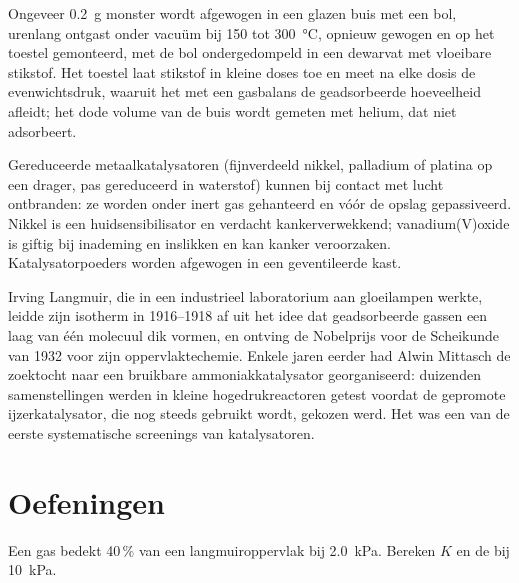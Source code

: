 \begin{inthelab}
Ongeveer \qty{0.2}{g} monster wordt afgewogen in een glazen buis met een
bol, urenlang ontgast onder vacuüm bij 150 tot \qty{300}{\celsius},
opnieuw gewogen en op het toestel gemonteerd, met de bol ondergedompeld in
een dewarvat met vloeibare stikstof. Het toestel laat stikstof in kleine
doses toe en meet na elke dosis de evenwichtsdruk, waaruit het met een
gasbalans de geadsorbeerde hoeveelheid afleidt; het dode volume van de
buis wordt gemeten met helium, dat niet adsorbeert.
\end{inthelab}

\begin{safety}{}
Gereduceerde metaalkatalysatoren (fijnverdeeld nikkel, palladium of
platina op een drager, pas gereduceerd in waterstof) kunnen bij contact
met lucht ontbranden: ze worden onder inert gas gehanteerd en vóór de
opslag gepassiveerd. Nikkel is een huidsensibilisator en verdacht
kankerverwekkend; vanadium(V)oxide is giftig bij inademing en inslikken en
kan kanker veroorzaken. Katalysatorpoeders worden afgewogen in een
geventileerde kast.
\end{safety}

\begin{history}
Irving Langmuir, die in een industrieel laboratorium aan gloeilampen
werkte, leidde zijn isotherm in 1916--1918 af uit het idee dat
geadsorbeerde gassen een laag van één molecuul dik vormen, en ontving de
Nobelprijs voor de Scheikunde van 1932 voor zijn oppervlaktechemie.
Enkele jaren eerder had Alwin Mittasch de zoektocht naar een bruikbare
ammoniakkatalysator georganiseerd: duizenden samenstellingen werden in
kleine hogedrukreactoren getest voordat de gepromote ijzerkatalysator, die
nog steeds gebruikt wordt, gekozen werd. Het was een van de eerste
systematische screenings van katalysatoren.
\end{history}

\section{Oefeningen}

\begin{exercise}[$\star$]\label{exo:b3:surfaces-catalysis:1}
Een gas bedekt 40\,\% van een langmuiroppervlak bij \qty{2.0}{kPa}. Bereken
$K$ en de  bij
\qty{10}{kPa}.
\end{exercise}

